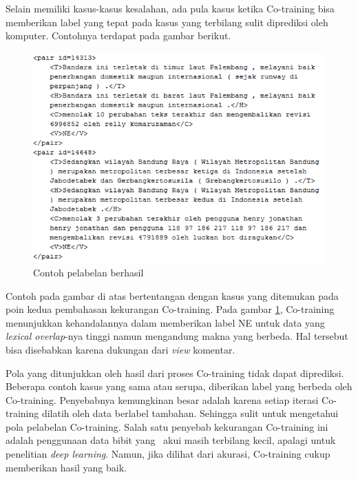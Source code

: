 Selain memiliki kasus-kasus kesalahan, ada pula kasus ketika Co-training bisa memberikan label yang tepat pada kasus yang terbilang sulit diprediksi oleh komputer. Contohnya terdapat pada gambar berikut.
\begin{figure}
	\centering
	\includegraphics[width=0.85\linewidth]{pics/bagus-1}
	\caption{Contoh pelabelan berhasil}
	\label{pic:bagus-1}
\end{figure}
\noindent Contoh pada gambar di atas bertentangan dengan kasus yang ditemukan pada poin kedua pembahasan kekurangan Co-training. Pada gambar \ref{pic:bagus-1}, Co-training menunjukkan kehandalannya dalam memberikan label NE untuk data yang \textit{lexical overlap}-nya tinggi namun mengandung makna yang berbeda. Hal tersebut bisa disebabkan karena dukungan dari \textit{view} komentar.

Pola yang ditunjukkan oleh hasil dari proses Co-training tidak dapat diprediksi. Beberapa contoh kasus yang sama atau serupa, diberikan label yang berbeda oleh Co-training. Penyebabnya kemungkinan besar adalah karena setiap iterasi Co-training dilatih oleh data berlabel tambahan. Sehingga sulit untuk mengetahui pola pelabelan Co-training. Salah satu penyebab kekurangan Co-training ini adalah penggunaan data bibit yang \saya~akui masih terbilang kecil, apalagi untuk penelitian \textit{deep learning}. Namun, jika dilihat dari akurasi, Co-training cukup memberikan hasil yang baik.

